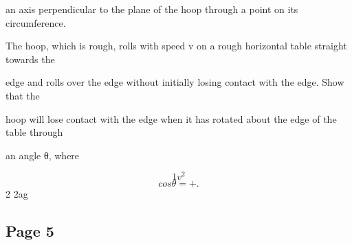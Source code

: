\documentclass[12pt]{article}
\begin{document}
\begin{flushleft}
an axis perpendicular to the plane of the hoop through a point on its circumference.\par
The hoop, which is rough, rolls with speed v on a rough horizontal table straight towards the\par
edge and rolls over the edge without initially losing contact with the edge. Show that the\par
hoop will lose contact with the edge when it has rotated about the edge of the table through\par
an angle θ, where\par
\[1 v^2\]
\[cos θ = + .\]
2 2ag\par
\end{flushleft}
\subsection*{Page 5}
\end{document}
